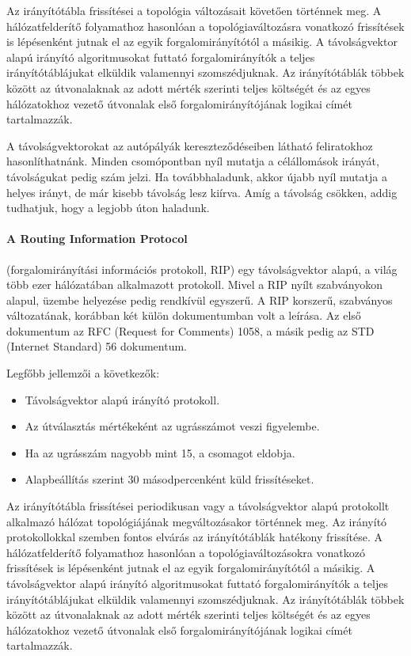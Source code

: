 Az irányítótábla frissítései a topológia változásait követően történnek meg. A hálózatfelderítő folyamathoz hasonlóan a topológiaváltozásra vonatkozó frissítések is lépésenként jutnak el az egyik forgalomirányítótól a másikig. A távolságvektor alapú irányító algoritmusokat futtató forgalomirányítók a teljes irányítótáblájukat elküldik valamennyi szomszédjuknak. Az irányítótáblák többek között az útvonalaknak az adott mérték szerinti teljes költségét és az egyes hálózatokhoz vezető útvonalak első forgalomirányítójának logikai címét tartalmazzák.

A távolságvektorokat az autópályák kereszteződéseiben látható feliratokhoz hasonlíthatnánk. Minden csomópontban nyíl mutatja a célállomások irányát, távolságukat pedig szám jelzi. Ha továbbhaladunk, akkor újabb nyíl mutatja a helyes irányt, de már kisebb távolság lesz kiírva. Amíg a távolság csökken, addig tudhatjuk, hogy a legjobb úton haladunk.

\paragraph{A Routing Information Protocol}
(forgalomirányítási információs protokoll, RIP) egy távolságvektor alapú, a világ több ezer hálózatában alkalmazott protokoll. Mivel a RIP nyílt szabványokon alapul, üzembe helyezése pedig rendkívül egyszerű. A RIP korszerű, szabványos változatának, korábban két külön dokumentumban volt a leírása. Az első dokumentum az RFC (Request for Comments) 1058, a másik pedig az STD (Internet Standard) 56 dokumentum.

Legfőbb jellemzői a következők:
\begin{itemize}[nosep]
	\item Távolságvektor alapú irányító protokoll.
	\item Az útválasztás mértékeként az ugrásszámot veszi figyelembe.
	\item Ha az ugrásszám nagyobb mint 15, a csomagot eldobja.
	\item Alapbeállítás szerint 30 másodpercenként küld frissítéseket.
\end{itemize}

Az irányítótábla frissítései periodikusan vagy a távolságvektor alapú protokollt alkalmazó hálózat topológiájának megváltozásakor történnek meg. Az irányító protokollokkal szemben fontos elvárás az irányítótáblák hatékony frissítése. A hálózatfelderítő folyamathoz hasonlóan a topológiaváltozásokra vonatkozó frissítések is lépésenként jutnak el az egyik forgalomirányítótól a másikig. A távolságvektor alapú irányító algoritmusokat futtató forgalomirányítók a teljes irányítótáblájukat elküldik valamennyi szomszédjuknak. Az irányítótáblák többek között az útvonalaknak az adott mérték szerinti teljes költségét és az egyes hálózatokhoz vezető útvonalak első forgalomirányítójának logikai címét tartalmazzák.

